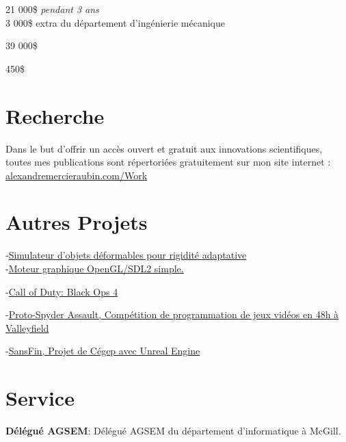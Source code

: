\documentclass[10pt]{article} %
\begin{document}
{
 21 000\$ \textit{pendant 3 ans} \\
 3 000\$ extra du département d'ingénierie mécanique\\
}

{
\textit{} 39 000\$\\
}


{
\textit{} 450\$\\
}

\section{Recherche}
Dans le but d'offrir un accès ouvert et gratuit aux innovations scientifiques, toutes mes publications sont répertoriées gratuitement sur mon site internet : \href{https://alexandremercieraubin.com/Work}{alexandremercieraubin.com/Work}


\section{Autres Projets}

{
-\href{https://github.com/AlexandreMercierAubin/AdaptiveRigidification2022}{Simulateur d'objets déformables pour rigidité adaptative}\\
-\href{https://github.com/AlexandreMercierAubin/ComputerGraphics}{Moteur graphique OpenGL/SDL2 simple.}\\

}

{
-\href{https://www.callofduty.com/ca/en/blackops4}{Call of Duty: Black Ops 4}

-\href{https://youtu.be/qJjy8b0kuSY}{Proto-Spyder Assault, Compétition de programmation de jeux vidéos en 48h à Valleyfield}

-\href{https://youtu.be/s6vr07Nt1IY}{SansFin, Projet de Cégep avec Unreal Engine}
}

\section{Service}
\textbf{Délégué AGSEM}: Délégué AGSEM du département d'informatique à McGill.
\end{document}
